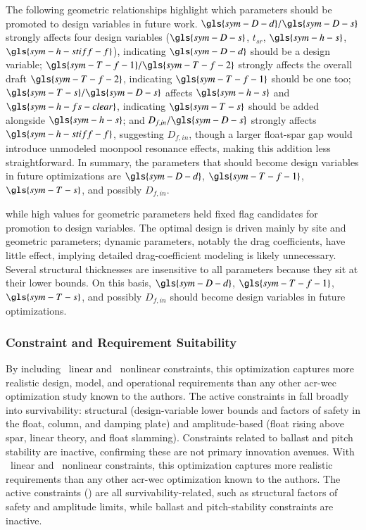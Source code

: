    The following geometric relationships highlight which parameters should be promoted to design variables in future work.
    $\gls{sym-D-d}/\gls{sym-D-s}$ strongly affects four design variables ($\gls{sym-D-s}$, $t_{sr}$, $\gls{sym-h-s}$, $\gls{sym-h-stiff-f}$), indicating $\gls{sym-D-d}$ should be a design variable;
    $\gls{sym-T-f-1}/\gls{sym-T-f-2}$ strongly affects the overall draft $\gls{sym-T-f-2}$, indicating $\gls{sym-T-f-1}$ should be one too;
    $\gls{sym-T-s}/\gls{sym-D-s}$ affects $\gls{sym-h-s}$ and $\gls{sym-h-fs-clear}$, indicating $\gls{sym-T-s}$ should be added alongside $\gls{sym-h-s}$;
    and $D_{f,in}/\gls{sym-D-s}$ strongly affects $\gls{sym-h-stiff-f}$, suggesting $D_{f,in}$,
    though a larger float-spar gap would introduce unmodeled moonpool resonance effects, making this addition less straightforward.
    In summary, the parameters that should become design variables in future optimizations are $\gls{sym-D-d}$, $\gls{sym-T-f-1}$, $\gls{sym-T-s}$, and possibly $D_{f,in}$.
\else
    
    while high values for geometric parameters held fixed flag candidates for promotion to design variables.
    The optimal design is driven mainly by site and geometric parameters;
    dynamic parameters, notably the drag coefficients, have little effect, implying detailed drag-coefficient modeling is likely unnecessary.
    Several structural thicknesses are insensitive to all parameters because they sit at their lower bounds.
    On this basis, $\gls{sym-D-d}$, $\gls{sym-T-f-1}$, $\gls{sym-T-s}$, and possibly $D_{f,in}$ should become design variables in future optimizations.
\fi

\subsubsection{Constraint and Requirement Suitability}
\ifdefined\DISSERTATION
    By including \resultsRE[numLinConstraints]~linear and \resultsRE[numNonlinConstraints]~nonlinear constraints, this optimization captures more realistic design, model, and operational requirements than any other \gls{acr-wec} optimization study known to the authors.
    The active constraints in  fall broadly into survivability: structural (design-variable lower bounds and factors of safety in the float, column, and damping plate) and amplitude-based (float rising above spar, linear theory, and float slamming).
    Constraints related to ballast and pitch stability are inactive, confirming these are not primary innovation avenues.
\else
    With \resultsRE[numLinConstraints]~linear and \resultsRE[numNonlinConstraints]~nonlinear constraints, this optimization captures more realistic requirements than any other \gls{acr-wec} optimization known to the authors.
    The active constraints () are all survivability-related, such as structural factors of safety and amplitude limits, while ballast and pitch-stability constraints are inactive.
\fi

